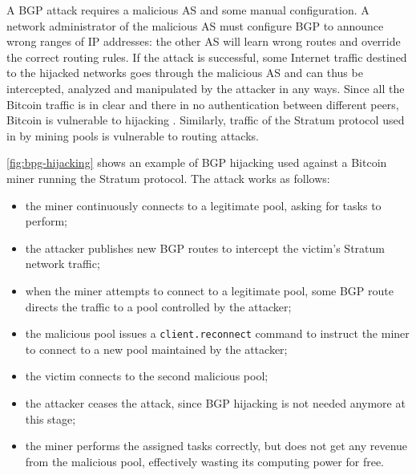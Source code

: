A \ac{BGP} attack requires a malicious \ac{AS} and some manual configuration.
A network administrator of the malicious \ac{AS} must configure \ac{BGP} to announce wrong ranges of IP addresses:
the other \ac{AS} will learn wrong routes and override the correct routing rules.
If the attack is successful, some Internet traffic destined to the hijacked networks goes through the malicious \ac{AS} and can thus be intercepted, analyzed and manipulated by the attacker in any ways.
Since all the Bitcoin traffic is in clear and there in no authentication between different peers, Bitcoin is vulnerable to hijacking \cite{hijacking_bitcoin_2017}.
Similarly, traffic of the Stratum protocol used in by mining pools is vulnerable to routing attacks.

\medskip
\cref{fig:bpg-hijacking} shows an example of \ac{BGP} hijacking used against a Bitcoin miner running the Stratum protocol.
The attack works as follows:
\begin{itemize}
	\item the miner continuously connects to a legitimate pool, asking for tasks to perform;
	\item the attacker publishes new \ac{BGP} routes to intercept the victim's Stratum network traffic;
	\item when the miner attempts to connect to a legitimate pool, some \ac{BGP} route directs the traffic to a pool controlled by the attacker;
	\item the malicious pool issues a \texttt{client.reconnect} \cite{stratum_manual} command to instruct the miner to connect to a new pool maintained by the attacker;
	\item the victim connects to the second malicious pool;
	\item the attacker ceases the attack, since \ac{BGP} hijacking is not needed anymore at this stage;
	\item the miner performs the assigned tasks correctly, but does not get any revenue from the malicious pool, effectively wasting its computing power for free.
\end{itemize}

